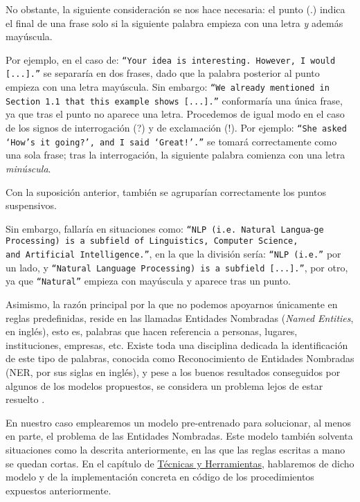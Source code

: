 No obstante, la siguiente consideración se nos hace necesaria: el punto (.) indica el final de una frase solo si la siguiente palabra empieza con una letra \emph{y} además mayúscula.

Por ejemplo, en el caso de: \texttt{``Your idea is interesting. However, I would [...].''} se separaría en dos frases, dado que la palabra posterior al punto empieza con una letra mayúscula. Sin embargo: \texttt{``We already mentioned in Section 1.1 that this example shows [...].''} conformaría una única frase, ya que tras el punto no aparece una letra. Procedemos de igual modo en el caso de los signos de interrogación (?) y de exclamación (!). Por ejemplo: \texttt{``She asked \lq How's it going?\rq, and I said \lq Great!\rq.''} se tomará correctamente como una sola frase; tras la interrogación, la siguiente palabra comienza con una letra \emph{minúscula}.
	
Con la suposición anterior, también se agruparían correctamente los puntos suspensivos.

Sin embargo, fallaría en situaciones como: \texttt{``NLP (i.e. Natural Langua}-\texttt{ge Processing) is a subfield of Linguistics, Computer Science, \\ and Artificial Intelligence.''}, en la que la división sería: \texttt{``NLP (i.e.''} por un lado, y \texttt{``Natural Language Processing) is a subfield [...].''}, por otro, ya que \texttt{``Natural''} empieza con mayúscula y aparece tras un punto.

Asimismo, la razón principal por la que no podemos apoyarnos únicamente en reglas predefinidas, reside en las llamadas Entidades Nombradas (\emph{Named Entities}, en inglés), esto es, palabras que hacen referencia a personas, lugares, instituciones, empresas, etc. Existe toda una disciplina dedicada la identificación de este tipo de palabras, conocida como Reconocimiento de Entidades Nombradas (NER, por sus siglas en inglés), y pese a los buenos resultados conseguidos por algunos de los modelos propuestos, se considera un problema lejos de estar resuelto \cite{ner20}.

En nuestro caso emplearemos un modelo pre-entrenado para solucionar, al menos en parte, el problema de las Entidades Nombradas. Este modelo también solventa situaciones como la descrita anteriormente, en las que las reglas escritas a mano se quedan cortas. En el capítulo de \hyperref[chapter:tecnicas]{Técnicas y Herramientas}, hablaremos de dicho modelo y de la implementación concreta en código de los procedimientos expuestos anteriormente.

